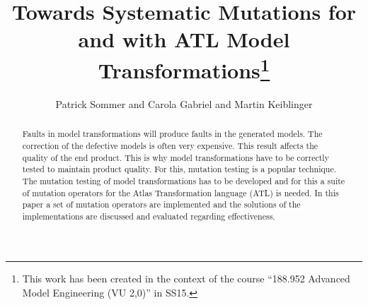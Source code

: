 \documentclass{llncs}
\begin{document}
\pagestyle{plain}

\title{Towards Systematic Mutations for and with ATL Model Transformations\footnote{This work has been created in the context of the course ``188.952 Advanced Model Engineering (VU 2,0)'' in SS15.}}


\author{Patrick Sommer and Carola Gabriel and Martin Keiblinger}


\maketitle

\begin{abstract}

Faults in model transformations will produce faults in the generated models. The
correction of the defective models is often very expensive. This result affects the quality
of the end product. This is why model transformations have to be correctly
tested to maintain product quality. For this, mutation testing is a popular
technique.  The mutation testing of model transformations has to be developed
and for this a suite of mutation operators for the Atlas Transformation language (ATL) is needed. In this paper a set of mutation operators are implemented and the solutions of the implementations are discussed and evaluated regarding effectiveness.

\end{abstract}

\tableofcontents
\newpage
\end{document}
